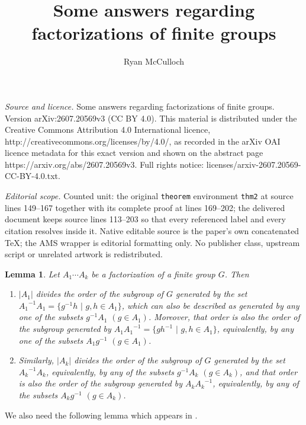 \documentclass[10pt,a4paper]{amsart}
\newtheorem{lemma}[theorem]{Lemma}
\begin{document}
\title[Some answers regarding factorizations of finite groups]{Some answers regarding factorizations of finite groups}
\author{Ryan McCulloch}
\date{}
\maketitle
\noindent\emph{Source and licence.} Some answers regarding factorizations of finite groups. Version arXiv:2607.20569v3 (CC BY 4.0). This material is distributed under the Creative Commons Attribution 4.0 International licence, http://creativecommons.org/licenses/by/4.0/, as recorded in the arXiv OAI licence metadata for this exact version and shown on the abstract page https://arxiv.org/abs/2607.20569v3. Full rights notice: licenses/arxiv-2607.20569-CC-BY-4.0.txt.\par\smallskip
\noindent\textit{Editorial scope.} Counted unit: the original \texttt{theorem} environment \texttt{thm2} at source lines 149--167 together with its complete proof at lines 169--202; the delivered document keeps source lines 113--203 so that every referenced label and every citation resolves inside it. Native editable source is the paper's own concatenated TeX; the AMS wrapper is editorial formatting only. No publisher class, upstream script or unrelated artwork is redistributed.
\begin{lemma}\label{lem: first_last}
Let $A_1 \cdots A_k$ be a factorization of a finite group $G$. Then
\begin{enumerate}
\item $|A_1|$ divides the order of the subgroup of $G$ generated by the set ${A_1}^{-1} A_1 = \{ g^{-1}h \,\, | \,\, g,h \in A_1 \}$, which can also be described as generated by any one of the subsets $g^{-1} A_1$ $(g \in A_1)$.  Moreover, that order is also the order of the subgroup generated by $A_1{A_1}^{-1} = \{ gh^{-1} \,\, | \,\, g,h \in A_1 \}$, equivalently, by any one of the subsets $A_1 g^{-1}$ $(g \in A_1)$.
\item Similarly, $|A_k|$ divides the order of the subgroup of $G$ generated by the set ${A_k}^{-1} A_k$, equivalently, by any of the subsets $g^{-1} A_k$ $(g \in A_k)$, and that order is also the order of the subgroup generated by $A_k{A_k}^{-1}$, equivalently, by any of the subsets $A_k g^{-1}$ $(g \in A_k)$.
\end{enumerate}
\end{lemma}

We also need the following lemma which appears in \cite{berg, sands}. 
\end{document}
